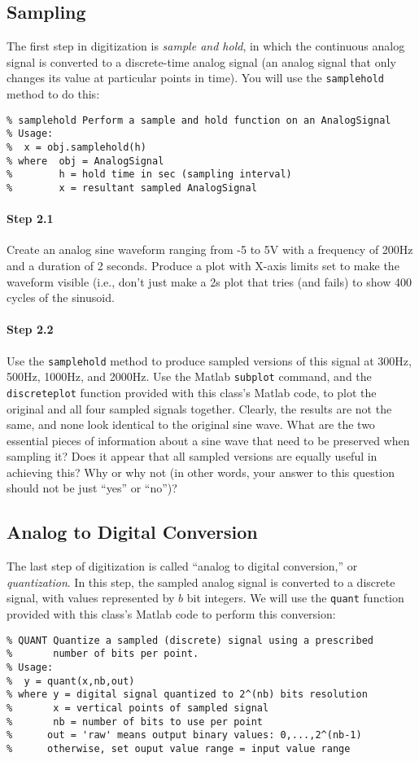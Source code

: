 \subsection{Sampling}

The first step in digitization is \emph{sample and hold}, in which the
continuous analog signal is converted to a discrete-time analog signal
(an analog signal that only changes its value at particular points in
time). You will use the \texttt{samplehold} method to do this:
\begin{verbatim}
% samplehold Perform a sample and hold function on an AnalogSignal
% Usage:
%  x = obj.samplehold(h)
% where  obj = AnalogSignal
%        h = hold time in sec (sampling interval)
%        x = resultant sampled AnalogSignal
\end{verbatim}

\paragraph{Step 2.1} Create an analog sine waveform ranging from -5 to
5V with a frequency of 200Hz and a duration of 2 seconds. Produce a
plot with X-axis limits set to make the waveform visible (i.e., don't
just make a 2s plot that tries (and fails) to show 400 cycles of the
sinusoid.

\paragraph{Step 2.2} Use the \texttt{samplehold} method to produce
sampled versions of this signal at 300Hz, 500Hz, 1000Hz, and
2000Hz. Use the Matlab \texttt{subplot} command, and the
\texttt{discreteplot} function provided with this class's Matlab code,
to plot the original and all four sampled signals together. Clearly,
the results are not the same, and none look identical to the original
sine wave. What are the two essential pieces of information about a
sine wave that need to be preserved when sampling it? Does it appear
that all sampled versions are equally useful in achieving this? Why or
why not (in other words, your answer to this question should not be
just ``yes'' or ``no'')?


\subsection{Analog to Digital Conversion}

The last step of digitization is called ``analog to digital
conversion,'' or \emph{quantization}. In this step, the sampled analog
signal is converted to a discrete signal, with values represented by
$b$ bit integers. We will use the \texttt{quant} function provided
with this class's Matlab code to perform this conversion:
\begin{verbatim}
% QUANT Quantize a sampled (discrete) signal using a prescribed
%       number of bits per point.
% Usage:
%  y = quant(x,nb,out)
% where y = digital signal quantized to 2^(nb) bits resolution
%       x = vertical points of sampled signal
%       nb = number of bits to use per point
%      out = 'raw' means output binary values: 0,...,2^(nb-1)
%      otherwise, set ouput value range = input value range
\end{verbatim}

